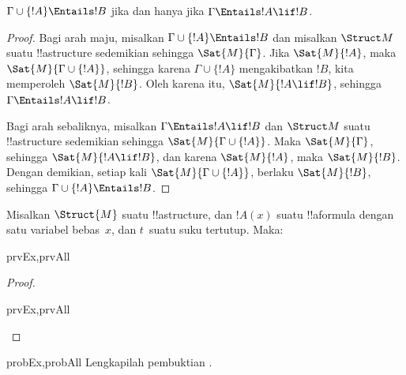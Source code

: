 \documentclass[../../../include/open-logic-section]{subfiles}
\begin{document}
\begin{thm}
$\Gamma \cup \{!A\} \Entails !B$ jika dan hanya jika
$\Gamma \Entails !A \lif !B$.
\end{thm}

\begin{proof}
Bagi arah maju, misalkan $\Gamma \cup \{ !A \} \Entails !B$ dan misalkan
$\Struct M$ suatu !!a{structure} sedemikian sehingga $\Sat{M}{\Gamma}$.
Jika $\Sat{M}{!A}$, maka $\Sat{M}{\Gamma \cup \{ !A \} }$, sehingga karena
$\Gamma \cup \{ !A \}$ mengakibatkan $!B$, kita memperoleh
$\Sat{M}{!B}$. Oleh karena itu, $\Sat{M}{!A \lif !B}$, sehingga
$\Gamma \Entails !A \lif !B$.

Bagi arah sebaliknya, misalkan $\Gamma \Entails !A \lif !B$ dan
$\Struct M$ suatu !!a{structure} sedemikian sehingga
$\Sat{M}{\Gamma \cup \{ !A \}}$. Maka $\Sat{M}{\Gamma}$, sehingga
$\Sat{M}{!A \lif !B}$, dan karena $\Sat{M}{!A}$, maka $\Sat{M}{!B}$.
Dengan demikian, setiap kali $\Sat{M}{\Gamma \cup \{ !A \} }$, berlaku
$\Sat{M}{!B}$, sehingga $\Gamma \cup \{ !A \} \Entails !B$.
\end{proof}

\begin{prop}
  Misalkan $\Struct{M}$ suatu !!a{structure}, dan $!A(x)$ suatu
  !!a{formula} dengan satu variabel bebas~$x$, dan $t$~suatu suku tertutup.
  Maka:
  \begin{tagenumerate}{prvEx,prvAll}
  \end{tagenumerate}
\end{prop}

\begin{proof}
  \begin{tagenumerate}{prvEx,prvAll}
  \end{tagenumerate}
\end{proof}

\begin{probtag}{probEx,probAll}
  Lengkapilah pembuktian .
\end{probtag}
\end{document}

